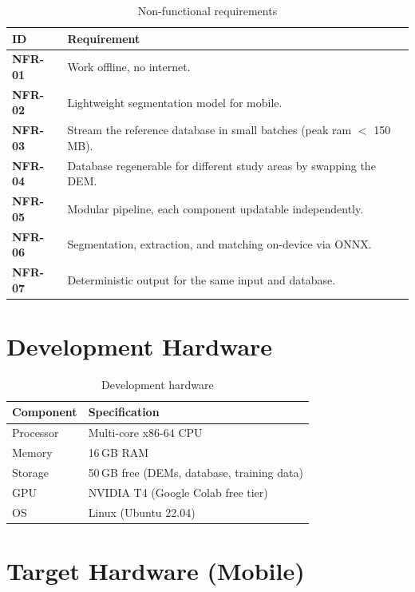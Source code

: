 \begin{table}[H]
\centering
\caption{Non-functional requirements}
\label{tab:nonfunctional_requirements}
\begin{tabularx}{0.95\textwidth}{>{\bfseries}l X}
\toprule
ID & Requirement \\
\midrule
NFR-01 & Work offline, no internet. \\
NFR-02 & Lightweight segmentation model for mobile. \\
NFR-03 & Stream the reference database in small batches (peak \Gls{ram} $<$ 150\,MB). \\
NFR-04 & Database regenerable for different study areas by swapping the DEM. \\
NFR-05 & Modular pipeline, each component updatable independently. \\
NFR-06 & Segmentation, extraction, and matching on-device via ONNX. \\
NFR-07 & Deterministic output for the same input and database. \\
\bottomrule
\end{tabularx}
\end{table}

\section{Development Hardware}

\begin{table}[H]
\centering
\caption{Development hardware}
\label{tab:dev_hardware}
\begin{tabular}{ll}
\toprule
\textbf{Component} & \textbf{Specification} \\
\midrule
Processor & Multi-core x86-64 CPU \\
Memory & 16\,GB RAM \\
Storage & 50\,GB free (DEMs, database, training data) \\
GPU & NVIDIA T4 (Google Colab free tier) \\
OS & Linux (Ubuntu 22.04) \\
\bottomrule
\end{tabular}
\end{table}

\section{Target Hardware (Mobile)}

